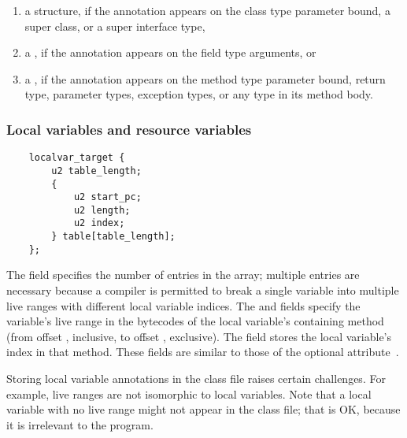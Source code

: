 \documentclass[10pt]{article}
\begin{document}
\begin{enumerate}
\item
a  structure, if the annotation appears on the class
type parameter bound, a super class, or a super interface type,

\item
a , if the annotation appears on the field type
arguments, or

\item
a , if the annotation appears on the method type
parameter bound, return type, parameter types, exception types, or any type
in its method body.

\end{enumerate}


\subsubsection{Local variables and resource variables\label{class-file:ext:ri:localvar}}


\preverbnegspace
\begin{Verbatim}
    localvar_target {
        u2 table_length;
        {
            u2 start_pc;
            u2 length;
            u2 index;
        } table[table_length];
    };
\end{Verbatim}

The  field specifies the number of entries in the
 array; multiple entries are necessary because a compiler is
permitted to break a single variable into multiple live ranges with different
local variable indices.
The  and  fields specify the variable's
live range in the bytecodes of the local variable's containing method
(from offset , inclusive, to offset , exclusive).  The
 field stores the local variable's index in that method.
These fields are similar to those of the optional
 attribute~\cite[\S 4.8.12]{LindholmY99:CFF5}.

Storing local variable annotations in the class file raises certain
challenges.  For example, live ranges are not isomorphic to local
variables.  Note that a local variable with no live range might not appear in
the class file; that is OK, because it is irrelevant to the program.

\end{document}
